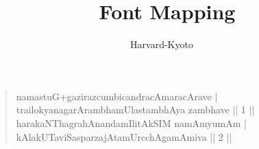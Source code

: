 \documentclass[a4paper,oneside,12pt]{article}
\title{\XeTeX\ Font Mapping}
\author{Harvard-Kyoto}
\date{\relax}
\newcommand{\dn}[1]{\textsanskrit{\devanagarifont#1}}
\begin{document}
\maketitle
\thispagestyle{empty}
\bigskip

\begin{verse}
  \dn{namastuG+gazirazcumbicandracAmaracArave |\\
    trailokyanagarArambhamUlastambhAya zambhave || 1 ||\\
    harakaNThagrahAnandamIlitAkSIM namAmyumAm |\\
    kAlakUTaviSasparzajAtamUrcchAgamAmiva || 2 ||}
\end{verse}
\end{document}
